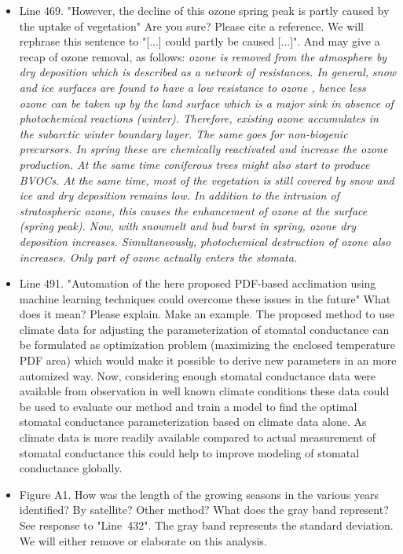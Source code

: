 \documentclass{scrartcl}
\begin{document}
\begin{itemize}
\item {\color{blue}Line 469. "However, the decline of this ozone spring peak is partly caused by the uptake of vegetation" Are you sure? Please cite a reference.}
We will rephrase this sentence to "[...] could partly be caused [...]". And may give a recap of ozone removal, as follows:
\emph{ozone is removed from the atmosphere by dry deposition which is described as a network of resistances. In general, snow and ice surfaces are found to have a low resistance to ozone , hence less ozone can be taken up by the land surface which is a major sink in absence of photochemical reactions (winter). Therefore, existing ozone accumulates in the subarctic winter boundary layer. The same goes for non-biogenic precursors. In spring these are chemically reactivated and increase the ozone production. At the same time coniferous trees might also start to produce BVOCs. At the same time, most of the vegetation is still covered by snow and ice and dry deposition remains low. In addition to the intrusion of stratospheric ozone, this causes the enhancement of ozone at the surface (spring peak). Now, with snowmelt and bud burst in spring, ozone dry deposition increases. Simultaneously, photochemical destruction of ozone also increases. Only part of ozone actually enters the stomata.}

\item {\color{blue}Line 491. "Automation of the here proposed PDF-based acclimation using machine learning techniques could overcome these issues in the future"
What does it mean? Please explain. Make an example.}
The proposed method to use climate data for adjusting the parameterization of stomatal conductance can be formulated as optimization problem (maximizing the enclosed temperature PDF area) which would make it possible to derive new parameters in an more automized way. 
Now, considering enough stomatal conductance data were available from observation in well known climate conditions these data could be used to evaluate our method and train a model to find the optimal stomatal conductance parameterization based on climate data alone. As climate data is more readily available compared to actual measurement of stomatal conductance this could help to improve modeling of stomatal conductance globally.

\item {\color{blue}Figure A1. How was the length of the growing seasons in the various years identified? By satellite? Other method? What does the gray band represent?} See response to "Line~432". The gray band represents the standard deviation. We will either remove or elaborate on this analysis.


\end{itemize}
\end{document}
